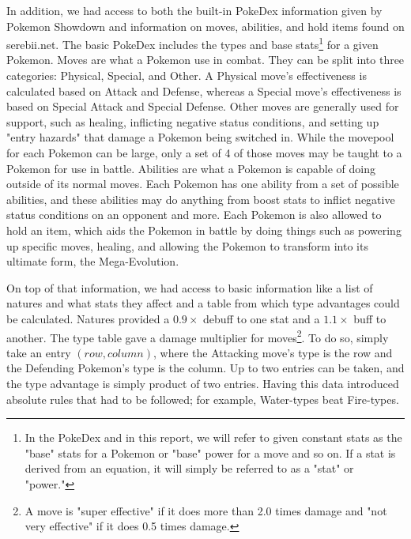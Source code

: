\documentclass{acm_proc_article-sp}
\begin{document}
In addition, we had access to both the built-in PokeDex information given by Pokemon Showdown and information on moves, abilities, and hold items found on serebii.net. The basic PokeDex includes the types and base stats\footnote{In the PokeDex and in this report, we will refer to given constant stats as the "base" stats for a Pokemon or "base" power for a move and so on. If a stat is derived from an equation, it will simply be referred to as a "stat" or "power."} for a given Pokemon. Moves are what a Pokemon use in combat. They can be split into three categories: Physical, Special, and Other. A Physical move's effectiveness is calculated based on Attack and Defense, whereas a Special move's effectiveness is based on Special Attack and Special Defense. Other moves are generally used for support, such as healing, inflicting negative status conditions, and setting up "entry hazards" that damage a Pokemon being switched in. While the movepool for each Pokemon can be large, only a set of 4 of those moves may be taught to a Pokemon for use in battle. Abilities are what a Pokemon is capable of doing outside of its normal moves. Each Pokemon has one ability from a set of possible abilities, and these abilities may do anything from boost stats to inflict negative status conditions on an opponent and more. Each Pokemon is also allowed to hold an item, which aids the Pokemon in battle by doing things such as powering up specific moves, healing, and allowing the Pokemon to transform into its ultimate form, the Mega-Evolution.

On top of that information, we had access to basic information like a list of natures and what stats they affect and a table from which type advantages could be calculated. Natures provided a $0.9\times$ debuff to one stat and a $1.1\times$ buff to another. The type table gave a damage multiplier for moves\footnote{A move is "super effective" if it does more than 2.0 times damage and "not very effective" if it does 0.5 times damage.}. To do so, simply take an entry $(row, column)$, where the Attacking move's type is the row and the Defending Pokemon's type is the column. Up to two entries can be taken, and the type advantage is simply product of two entries. Having this data introduced absolute rules that had to be followed; for example, Water-types beat Fire-types.
\end{document}
